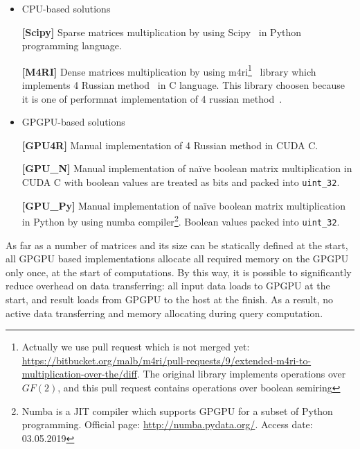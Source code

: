 \begin{itemize}
  \item CPU-based solutions

    \textbf{[Scipy]} Sparse matrices multiplication by using Scipy~\cite{scipy} in Python programming language.

    \textbf{[M4RI]} Dense matrices multiplication by using m4ri\footnote{Actually we use pull request which is not merged yet: \url{https://bitbucket.org/malb/m4ri/pull-requests/9/extended-m4ri-to-multiplication-over-the/diff}. The original library implements operations over $GF(2)$, and this pull request contains operations over boolean semiring}~\cite{M4RI} library which implements 4 Russian method~\cite{arlazarov1970economical} in C language.
    This library choosen because it is one of performnat implementation of 4 russian method~\cite{albrechtefficient}.
  \item GPGPU-based solutions

    \textbf{[GPU4R]} Manual implementation of 4 Russian method in CUDA C.

    \textbf{[GPU\_N]} Manual implementation of na\"ive boolean matrix multiplication in CUDA C with boolean values are treated as bits and packed into \texttt{uint_32}.

    \textbf{[GPU\_Py]} Manual implementation of na\"ive boolean matrix multiplication in Python by using numba compiler\footnote{Numba is a JIT compiler which supports GPGPU for a subset of Python programming. Official page: \url{http://numba.pydata.org/}. Access date: 03.05.2019}.
    Boolean values packed into \texttt{uint_32}.

\end{itemize}

As far as a number of matrices and its size can be statically defined at the start, all GPGPU based implementations allocate all required memory on the GPGPU only once, at the start of computations.
By this way, it is possible to significantly reduce overhead on data transferring: all input data loads to GPGPU at the start, and result loads from GPGPU to the host at the finish.
As a result, no active data transferring and memory allocating during query computation.
